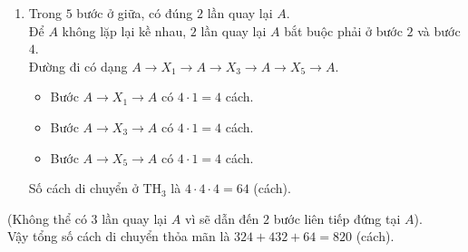 \begin{ex}
{\begin{enumerate}[\it TH 1:]
			Do không thể đứng yên tại $A$ trong $2$ bước liên tiếp, lần quay lại $A$ không thể là bước $1$ và bước $5$, nên chỉ có thể rơi vào bước $2$, $3$ hoặc $4$.
			\begin{itemize}
				\item Về $A$ ở bước $2$ ($A \to X_1 \to A \to X_3 \to X_4 \to X_5 \to A$).\\
				Số cách là $4 \cdot 1 \cdot 4 \cdot 3 \cdot 3 \cdot 1=144$ (cách).
				\item Về $A$ ở bước $3$ ($A \to X_1 \to X_2 \to A \to X_4 \to X_5 \to A$).\\
				Số cách là $4 \cdot 3 \cdot 1 \cdot 4 \cdot 3 \cdot 1=144$ (cách).
				\item Về $A$ ở bước $4$ ($A \to X_1 \to X_2 \to X_3 \to A \to X_5 \to A$).\\
				Số cách là $4 \cdot 3 \cdot 3 \cdot 1 \cdot 4 \cdot 1=144$ (cách).
			\end{itemize}
			Số cách di chuyển ở TH$_2$ là $144 \cdot 3=432$ (cách).
			\item Trong $5$ bước ở giữa, có đúng $2$ lần quay lại $A$.\\
			Để $A$ không lặp lại kề nhau, $2$ lần quay lại $A$ bắt buộc phải ở bước $2$ và bước $4$.\\
			Đường đi có dạng $A \to X_1 \to A \to X_3 \to A \to X_5 \to A$.
			\begin{itemize}
				\item Bước $A \to X_1 \to A$ có $4 \cdot 1=4$ cách.
				\item Bước $A \to X_3 \to A$ có $4 \cdot 1=4$ cách.
				\item Bước $A \to X_5 \to A$ có $4 \cdot 1=4$ cách.
			\end{itemize}
			Số cách di chuyển ở TH$_3$ là $4 \cdot 4 \cdot 4=64$ (cách).
		\end{enumerate}
		(Không thể có $3$ lần quay lại $A$ vì sẽ dẫn đến $2$ bước liên tiếp đứng tại $A$).\\
		Vậy tổng số cách di chuyển thỏa mãn là $324 + 432 + 64 = 820$ (cách).
	}
\end{ex}

